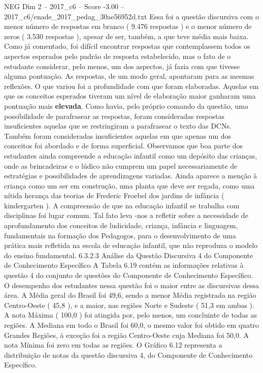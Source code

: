 \begin{textsample}{NEG Dim 2 – 2017\_c6 – Score -3.00 – 2017\_c6/enade\_2017\_pedag\_30ae56952d.txt}
Essa foi a questão discursiva com o menor número de respostas em branco ( 9.476 respostas ) e o menor número de zeros ( 3.530 respostas ), apesar de ser, também, a que teve média mais baixa.
Como já comentado, foi difícil encontrar respostas que contemplassem todos os aspectos esperados pelo padrão de resposta estabelecido, mas o fato de o estudante considerar, pelo menos, um dos aspectos, já fazia com que tivesse alguma pontuação.
As respostas, de um modo geral, apontaram para as mesmas reflexões.
O que variou foi a profundidade com que foram elaboradas.
Aquelas em que os conceitos esperados tiveram um nível de elaboração maior ganharam uma pontuação mais \textbf{elevada}.
Como havia, pelo próprio comando da questão, uma possibilidade de parafrasear as respostas, foram consideradas respostas insuficientes aquelas que se restringiram a parafrasear o texto das DCNs.
Também foram consideradas insuficientes aquelas em que apenas um dos conceitos foi abordado e de forma superficial.
Observamos que boa parte dos estudantes ainda compreende a educação infantil como um depósito das crianças, onde as brincadeiras e o lúdico não cumprem um papel necessariamente de estratégias e possibilidades de aprendizagens variadas.
Ainda aparece a menção à criança como um ser em construção, uma planta que deve ser regada, como uma nítida herança das teorias de Frederic Froebel dos jardins de infância ( kindergarten ).
A compreensão de que na educação infantil se trabalha com disciplinas foi lugar comum.
Tal fato leva -nos a refletir sobre a necessidade de aprofundamento dos conceitos de ludicidade, criança, infância e linguagem, fundamentais na formação dos Pedagogos, para o desenvolvimento de uma prática mais refletida na escola de educação infantil, que não reproduza o modelo do ensino fundamental. 6.3.2.3 Análise da Questão Discursiva 4 do Componente de Conhecimento Específico A Tabela 6.19 contém as informações relativas à questão 4 do conjunto de questões do Componente de Conhecimento Específico.
O desempenho dos estudantes nessa questão foi o maior entre as discursivas dessa área.
A Média geral do Brasil foi 49,6, sendo a menor Média registrada na região Centro-Oeste ( 45,8 ), e a maior, nas regiões Norte e Sudeste ( 51,3 em ambas ).
A nota Máxima ( 100,0 ) foi atingida por, pelo menos, um concluinte de todas as regiões.
A Mediana em todo o Brasil foi 60,0, o mesmo valor foi obtido em quatro Grandes Regiões, à exceção foi a região Centro-Oeste cuja Mediana foi 50,0.
A nota Mínima foi zero em todas as regiões.
O Gráfico 6.12 representa a distribuição de notas da questão discursiva 4, do Componente de Conhecimento Específico.

\end{textsample}
